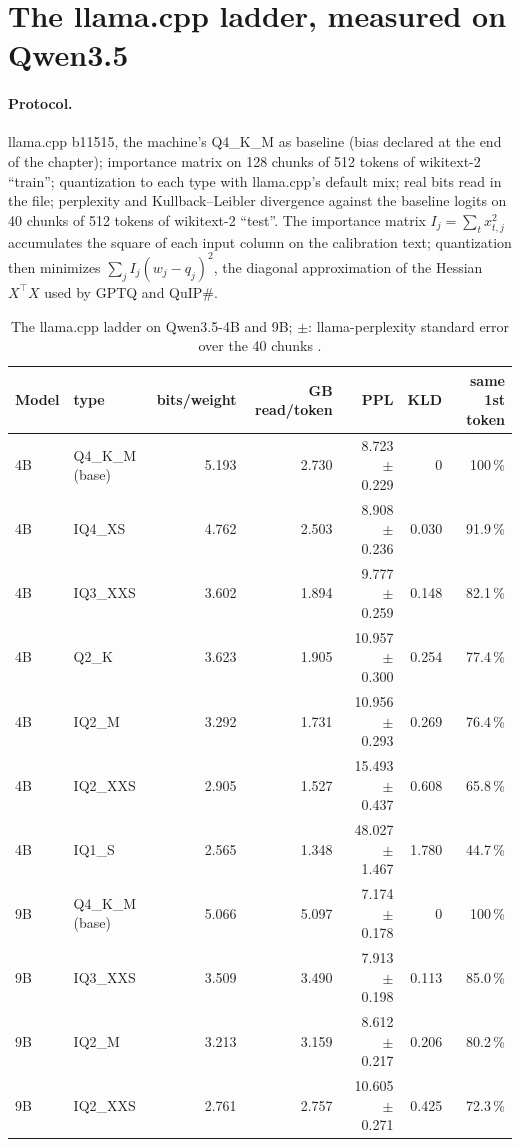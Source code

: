 \section{The llama.cpp ladder, measured on Qwen3.5}\label{sec:echelle}

\paragraph{Protocol.} llama.cpp b11515, the machine's Q4\_K\_M as baseline (bias declared at the end of the chapter); importance matrix on 128 chunks of 512 tokens of wikitext-2 \enquote{train}; quantization to each type with llama.cpp's default mix; real bits read in the file; perplexity and Kullback--Leibler divergence against the baseline logits on 40 chunks of 512 tokens of wikitext-2 \enquote{test}. The importance matrix $I_j = \sum_t x_{t,j}^2$ accumulates the square of each input column on the calibration text; quantization then minimizes $\sum_j I_j (w_j - q_j)^2$, the diagonal approximation of the Hessian $X^\top X$ used by GPTQ and QuIP\#.

\begin{table}[ht]
\centering\small
\caption[The llama.cpp ladder on Qwen3.5-4B and 9B]{The llama.cpp ladder on Qwen3.5-4B and 9B; $\pm$: llama-perplexity standard error over the 40 chunks \mes.}
\label{tab:echelle}
\begin{tabular}{@{}llrrrrr@{}}
\toprule
Model & type & bits/weight & GB read/token & PPL & KLD & same 1st token \\
\midrule
4B & Q4\_K\_M (base) & 5.193 & 2.730 & 8.723 $\pm$ 0.229 & 0 & 100\,\% \\
4B & IQ4\_XS & 4.762 & 2.503 & 8.908 $\pm$ 0.236 & 0.030 & 91.9\,\% \\
4B & IQ3\_XXS & 3.602 & 1.894 & 9.777 $\pm$ 0.259 & 0.148 & 82.1\,\% \\
4B & Q2\_K & 3.623 & 1.905 & 10.957 $\pm$ 0.300 & 0.254 & 77.4\,\% \\
4B & IQ2\_M & 3.292 & 1.731 & 10.956 $\pm$ 0.293 & 0.269 & 76.4\,\% \\
4B & IQ2\_XXS & 2.905 & 1.527 & 15.493 $\pm$ 0.437 & 0.608 & 65.8\,\% \\
4B & IQ1\_S & 2.565 & 1.348 & 48.027 $\pm$ 1.467 & 1.780 & 44.7\,\% \\
\midrule
9B & Q4\_K\_M (base) & 5.066 & 5.097 & 7.174 $\pm$ 0.178 & 0 & 100\,\% \\
9B & IQ3\_XXS & 3.509 & 3.490 & 7.913 $\pm$ 0.198 & 0.113 & 85.0\,\% \\
9B & IQ2\_M & 3.213 & 3.159 & 8.612 $\pm$ 0.217 & 0.206 & 80.2\,\% \\
9B & IQ2\_XXS & 2.761 & 2.757 & 10.605 $\pm$ 0.271 & 0.425 & 72.3\,\% \\
\bottomrule
\end{tabular}
\end{table}


